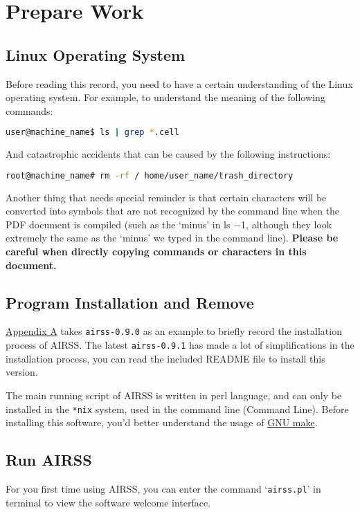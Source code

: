 \documentclass[a4paper, 10pt]{article}
\begin{document}
\newpage
\section{Prepare Work}
\subsection{Linux Operating System} 
Before reading this record, you need to have a certain understanding of the Linux operating system. For example, to understand the meaning of the following commands:
\begin{lstlisting}[language={bash}]
user@machine_name$ ls | grep *.cell
\end{lstlisting}

And catastrophic accidents that can be caused by the following instructions:
\begin{lstlisting}[language={bash}]
root@machine_name# rm -rf / home/user_name/trash_directory
\end{lstlisting}

Another thing that needs special reminder is that certain characters will be converted into symbols that are not recognized by the command line when the PDF document is compiled (such as the `minus' in ls \(-\)1, although they look extremely the same as the `minus' we typed in the command line). \textbf{Please be careful when directly copying commands or characters in this document.}

\subsection{Program Installation and Remove}

\hyperref[sec:airss-install]{Appendix A} takes \verb|airss-0.9.0| as an example to briefly record the installation process of AIRSS. The latest \verb|airss-0.9.1| has made a lot of simplifications in the installation process, you can read the included README file to install this version.

The main running script of AIRSS is written in perl language, and can only be installed in the \verb|*nix| system, used in the command line (Command Line). Before installing this software, you'd better understand the usage of \href{https://www.gnu.org/software/make/manual/}{GNU make}.

\subsection{Run AIRSS}
For you first time using AIRSS, you can enter the command `\verb|airss.pl|' in terminal to view the software welcome interface.
\end{document}
